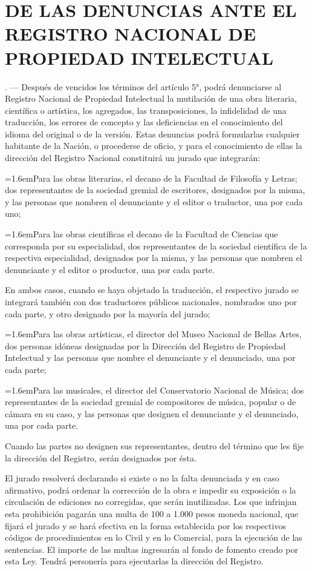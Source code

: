\documentclass[10pt,a4paper]{article}
\makeatletter
\newcommand{\titulo}[1]{\section{#1}}
\newcommand{\articulo}[3]{\par\if@nobreak\else\needspace{3\baselineskip}\fi\addvspace{5pt}%
  \phantomsection\addcontentsline{toc}{subsection}{#1}%
  \noindent{\color{azul}\bfseries #2} #3\par}
\newcommand{\inciso}[2]{\par{\hangindent=1.6em\hangafter=1\makebox[1.6em][l]{#1}#2\par}}
\makeatother
\begin{document}
\titulo{DE LAS DENUNCIAS ANTE EL REGISTRO NACIONAL DE PROPIEDAD INTELECTUAL}

\articulo{Art. 83}{Art. 83}{. — Después de vencidos los términos del artículo 5°, podrá denunciarse al Registro Nacional de Propiedad Intelectual la mutilación de una obra literaria, científica o artística, los agregados, las transposiciones, la infidelidad de una traducción, los errores de concepto y las deficiencias en el conocimiento del idioma del original o de la versión. Estas denuncias podrá formularlas cualquier habitante de la Nación, o procederse de oficio, y para el conocimiento de ellas la dirección del Registro Nacional constituirá un jurado que integrarán:}

\inciso{a)}{Para las obras literarias, el decano de la Facultad de Filosofía y Letras; dos representantes de la sociedad gremial de escritores, designados por la misma, y las personas que nombren el denunciante y el editor o traductor, una por cada uno;}

\inciso{b)}{Para las obras científicas el decano de la Facultad de Ciencias que corresponda por su especialidad, dos representantes de la sociedad científica de la respectiva especialidad, designados por la misma, y las personas que nombren el denunciante y el editor o productor, una por cada parte.}

En ambos casos, cuando se haya objetado la traducción, el respectivo jurado se integrará también con dos traductores públicos nacionales, nombrados uno por cada parte, y otro designado por la mayoría del jurado;

\inciso{c)}{Para las obras artísticas, el director del Museo Nacional de Bellas Artes, dos personas idóneas designadas por la Dirección del Registro de Propiedad Intelectual y las personas que nombre el denunciante y el denunciado, una por cada parte;}

\inciso{d)}{Para las musicales, el director del Conservatorio Nacional de Música; dos representantes de la sociedad gremial de compositores de música, popular o de cámara en su caso, y las personas que designen el denunciante y el denunciado, una por cada parte.}

Cuando las partes no designen sus representantes, dentro del término que les fije la dirección del Registro, serán designados por ésta.

El jurado resolverá declarando si existe o no la falta denunciada y en caso afirmativo, podrá ordenar la corrección de la obra e impedir su exposición o la circulación de ediciones no corregidas, que serán inutilizadas. Los que infrinjan esta prohibición pagarán una multa de 100 a 1.000 pesos moneda nacional, que fijará el jurado y se hará efectiva en la forma establecida por los respectivos códigos de procedimientos en lo Civil y en lo Comercial, para la ejecución de las sentencias. El importe de las multas ingresarán al fondo de fomento creado por esta Ley. Tendrá personería para ejecutarlas la dirección del Registro.
\end{document}
